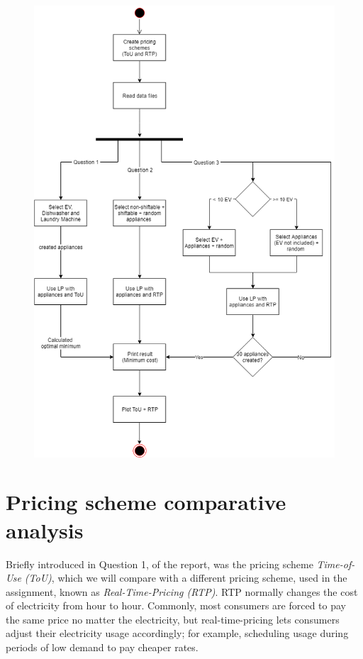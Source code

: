 \documentclass[
11pt, %
english, %
singlespacing, %
parskip, %
headsepline, %
]{report} %
\begin{document}
     \begin{figure}[ht]
    \includegraphics[scale=0.4]{flowChart.png}
    \centering
    \end{figure}

\newpage

    \section{Pricing scheme comparative analysis}
        Briefly introduced in Question 1, of the report, was the pricing scheme \emph{Time-of-Use (ToU)}, which we will compare with a different pricing scheme, used in the assignment, known as \emph{Real-Time-Pricing (RTP)}. RTP normally changes the cost of electricity from hour to hour. Commonly, most consumers are forced to pay the same price no matter the electricity, but real-time-pricing lets consumers adjust their electricity usage accordingly; for example, scheduling usage during periods of low demand to pay cheaper rates.
\end{document}
